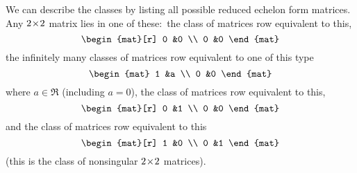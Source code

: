 \begin{example} \label{ex:RowEqClassTwoTwoMats}
We can describe the classes by listing all possible
reduced echelon form matrices.
Any $2 \! \times \! 2$ matrix lies in one of these:~the class of matrices
row equivalent to this,
\begin{equation*}
  \begin{mat}[r]
     0  &0  \\
     0  &0
  \end{mat}
\end{equation*}
the infinitely many classes of matrices row equivalent to one of this type
\begin{equation*}
  \begin{mat}
     1  &a  \\
     0  &0
  \end{mat}
\end{equation*}
where \( a\in\Re \) (including $a=0$),
the class of matrices row equivalent to this,
\begin{equation*}
  \begin{mat}[r]
     0  &1  \\
     0  &0
  \end{mat}
\end{equation*}
and the class of matrices row equivalent to this
\begin{equation*}
  \begin{mat}[r]
     1  &0  \\
     0  &1
  \end{mat}
\end{equation*}
(this is the class of nonsingular $2 \! \times \! 2$ matrices).
\end{example}




